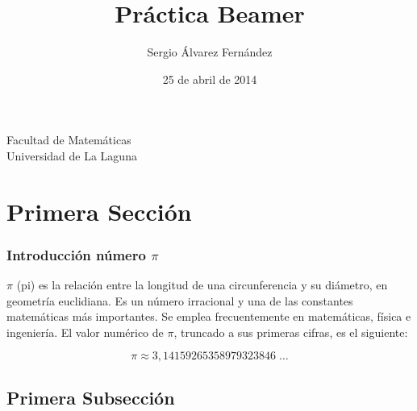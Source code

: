 \documentclass{beamer}
\title[Presentación con Beamer]{Práctica Beamer }
\author[SAF]{Sergio Álvarez Fernández}
\date[25-04-2014]{25 de abril de 2014}
\begin{document}
  
\begin{frame}

  \titlepage

  \begin{small}
    \begin{center}
     Facultad de Matemáticas \\
     Universidad de La Laguna
    \end{center}
  \end{small}

\end{frame}




\section{Primera Sección}


\begin{frame}

\frametitle{Introducción número $\pi$}


$\pi$ (pi) es la relación entre la longitud de una circunferencia y su diámetro, en geometría euclidiana. Es un número irracional y una de las constantes matemáticas más importantes. Se emplea frecuentemente en matemáticas, física e ingeniería. El valor numérico de $\pi$, truncado a sus primeras cifras, es el siguiente:

  \begin{displaymath}  
  \pi \approx 3,14159265358979323846 \; \dots 
  \end{displaymath}



\end{frame}

\subsection{Primera Subsección}
\end{document}
